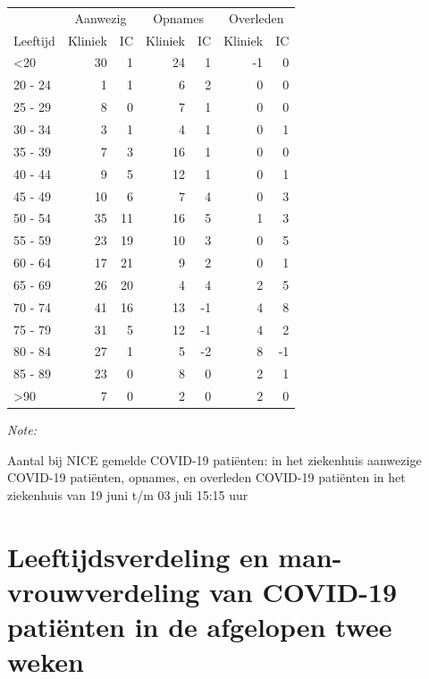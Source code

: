 \documentclass[
  english,
  man,floatsintext]{apa6}
\begin{document}
\begin{table}
\centering\begingroup\fontsize{10}{12}\selectfont

\begin{threeparttable}
\begin{tabular}{lrrrrrr}
\toprule
\multicolumn{1}{c}{ } & \multicolumn{2}{c}{Aanwezig} & \multicolumn{2}{c}{Opnames} & \multicolumn{2}{c}{Overleden} \\
\cmidrule(l{3pt}r{3pt}){2-3} \cmidrule(l{3pt}r{3pt}){4-5} \cmidrule(l{3pt}r{3pt}){6-7}
Leeftijd & Kliniek & IC & Kliniek & IC & Kliniek & IC\\
\midrule
<20 & 30 & 1 & 24 & 1 & -1 & 0\\
20 - 24 & 1 & 1 & 6 & 2 & 0 & 0\\
25 - 29 & 8 & 0 & 7 & 1 & 0 & 0\\
30 - 34 & 3 & 1 & 4 & 1 & 0 & 1\\
35 - 39 & 7 & 3 & 16 & 1 & 0 & 0\\
40 - 44 & 9 & 5 & 12 & 1 & 0 & 1\\
45 - 49 & 10 & 6 & 7 & 4 & 0 & 3\\
50 - 54 & 35 & 11 & 16 & 5 & 1 & 3\\
55 - 59 & 23 & 19 & 10 & 3 & 0 & 5\\
60 - 64 & 17 & 21 & 9 & 2 & 0 & 1\\
65 - 69 & 26 & 20 & 4 & 4 & 2 & 5\\
70 - 74 & 41 & 16 & 13 & -1 & 4 & 8\\
75 - 79 & 31 & 5 & 12 & -1 & 4 & 2\\
80 - 84 & 27 & 1 & 5 & -2 & 8 & -1\\
85 - 89 & 23 & 0 & 8 & 0 & 2 & 1\\
>90 & 7 & 0 & 2 & 0 & 2 & 0\\
\bottomrule
\end{tabular}
\begin{tablenotes}
\item \textit{Note: } 
\item Aantal bij NICE gemelde COVID-19 patiënten: in het ziekenhuis aanwezige COVID-19 patiënten, opnames, en overleden COVID-19 patiënten in het ziekenhuis van 19 juni t/m 03 juli 15:15 uur
\end{tablenotes}
\end{threeparttable}
\endgroup{}
\end{table}

\newpage

\hypertarget{leeftijdsverdeling-en-man-vrouwverdeling-van-covid-19-patiuxebnten-in-de-afgelopen-twee-weken}{%
\section{Leeftijdsverdeling en man-vrouwverdeling van COVID-19 patiënten in de afgelopen twee weken}\label{leeftijdsverdeling-en-man-vrouwverdeling-van-covid-19-patiuxebnten-in-de-afgelopen-twee-weken}}
\end{document}
